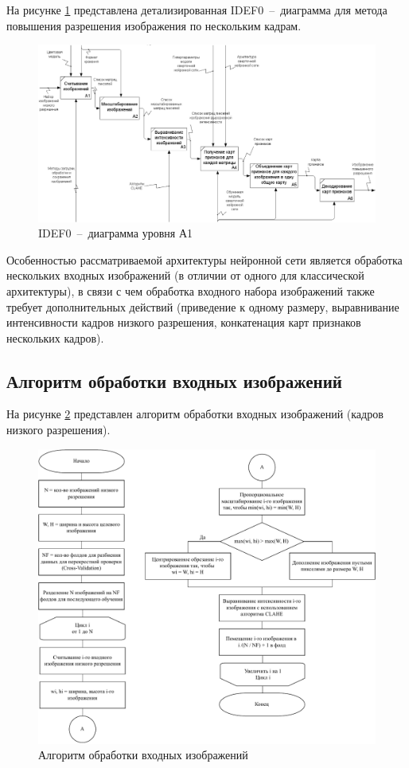 На рисунке \ref{idef0-a1} представлена детализированная IDEF0~--~диаграмма для метода повышения разрешения изображения по нескольким кадрам.

\begin{figure}[H]
    \centering
    \includegraphics[scale=0.5]{assets/idef0-a1.png}
    \caption{IDEF0~--~диаграмма уровня А1}
    \label{idef0-a1}
\end{figure}

Особенностью рассматриваемой архитектуры нейронной сети является обработка нескольких входных изображений (в отличии от одного для классической архитектуры), в связи с чем обработка входного набора изображений также требует дополнительных действий (приведение к одному размеру, выравнивание интенсивности кадров низкого разрешения, конкатенация карт признаков нескольких кадров).

\subsection{Алгоритм обработки входных изображений}

На рисунке \ref{data-proc} представлен алгоритм обработки входных изображений (кадров низкого разрешения).

\begin{figure}[H]
    \centering
    \includegraphics[scale=0.75]{assets/data_processing.pdf}
    \caption{Алгоритм обработки входных изображений}
    \label{data-proc}
\end{figure}

